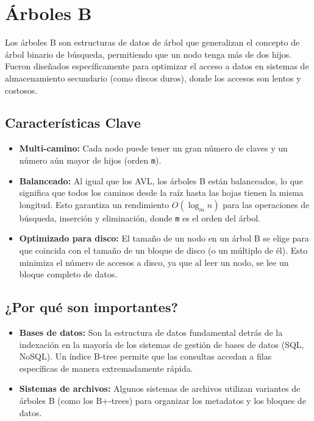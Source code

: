 \documentclass[
  spanish,
  letterpaper,
  DIV=11,
  numbers=noendperiod]{scrreprt}
\providecommand{\tightlist}{%
  \setlength{\itemsep}{0pt}\setlength{\parskip}{0pt}}
\begin{document}
\section{Árboles B}\label{uxe1rboles-b}

Los árboles B son estructuras de datos de árbol que generalizan el
concepto de árbol binario de búsqueda, permitiendo que un nodo tenga más
de dos hijos. Fueron diseñados específicamente para optimizar el acceso
a datos en sistemas de almacenamiento secundario (como discos duros),
donde los accesos son lentos y costosos.

\subsection{Características Clave}\label{caracteruxedsticas-clave}

\begin{itemize}
\tightlist
\item
  \textbf{Multi-camino:} Cada nodo puede tener un gran número de claves
  y un número aún mayor de hijos (orden \texttt{m}).
\item
  \textbf{Balanceado:} Al igual que los AVL, los árboles B están
  balanceados, lo que significa que todos los caminos desde la raíz
  hasta las hojas tienen la misma longitud. Esto garantiza un
  rendimiento \(O(\log_m n)\) para las operaciones de búsqueda,
  inserción y eliminación, donde \texttt{m} es el orden del árbol.
\item
  \textbf{Optimizado para disco:} El tamaño de un nodo en un árbol B se
  elige para que coincida con el tamaño de un bloque de disco (o un
  múltiplo de él). Esto minimiza el número de accesos a disco, ya que al
  leer un nodo, se lee un bloque completo de datos.
\end{itemize}

\subsection{¿Por qué son
importantes?}\label{por-quuxe9-son-importantes-1}

\begin{itemize}
\tightlist
\item
  \textbf{Bases de datos:} Son la estructura de datos fundamental detrás
  de la indexación en la mayoría de los sistemas de gestión de bases de
  datos (SQL, NoSQL). Un índice B-tree permite que las consultas accedan
  a filas específicas de manera extremadamente rápida.
\item
  \textbf{Sistemas de archivos:} Algunos sistemas de archivos utilizan
  variantes de árboles B (como los B+-trees) para organizar los
  metadatos y los bloques de datos.
\end{itemize}
\end{document}
